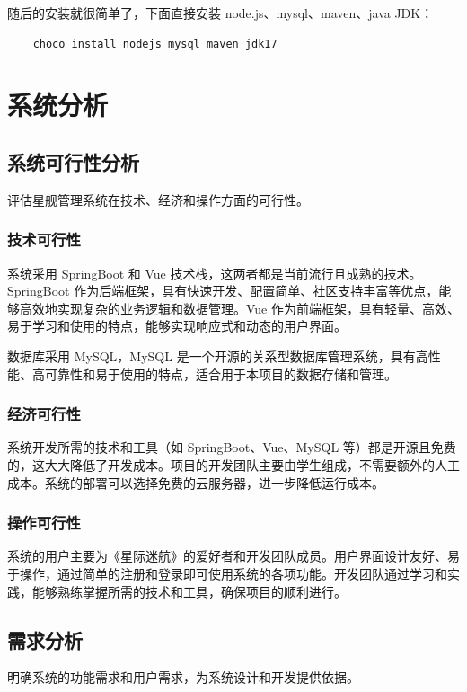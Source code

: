 \documentclass{base}
\begin{document}
随后的安装就很简单了，下面直接安装 node.js、mysql、maven、java JDK：
\begin{verbatim}
	choco install nodejs mysql maven jdk17
\end{verbatim}

\section{系统分析}

\subsection{系统可行性分析}

评估星舰管理系统在技术、经济和操作方面的可行性。

\subsubsection{技术可行性}

系统采用 SpringBoot 和 Vue 技术栈，这两者都是当前流行且成熟的技术。SpringBoot 作为后端框架，具有快速开发、配置简单、社区支持丰富等优点，能够高效地实现复杂的业务逻辑和数据管理。Vue 作为前端框架，具有轻量、高效、易于学习和使用的特点，能够实现响应式和动态的用户界面。

数据库采用 MySQL，MySQL 是一个开源的关系型数据库管理系统，具有高性能、高可靠性和易于使用的特点，适合用于本项目的数据存储和管理。

\subsubsection{经济可行性}
系统开发所需的技术和工具（如 SpringBoot、Vue、MySQL 等）都是开源且免费的，这大大降低了开发成本。项目的开发团队主要由学生组成，不需要额外的人工成本。系统的部署可以选择免费的云服务器，进一步降低运行成本。

\subsubsection{操作可行性}
系统的用户主要为《星际迷航》的爱好者和开发团队成员。用户界面设计友好、易于操作，通过简单的注册和登录即可使用系统的各项功能。开发团队通过学习和实践，能够熟练掌握所需的技术和工具，确保项目的顺利进行。

\subsection{需求分析}

明确系统的功能需求和用户需求，为系统设计和开发提供依据。
\end{document}
